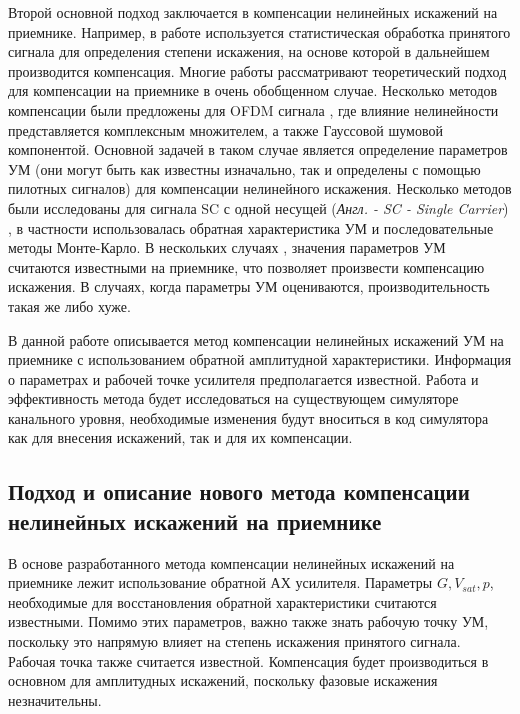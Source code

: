 Второй основной подход заключается в компенсации нелинейных искажений на
приемнике. Например, в работе \cite{maltsev2021} используется
статистическая обработка принятого сигнала для определения степени
искажения, на основе которой в дальнейшем производится компенсация. Многие
работы \cite[]{sharath2015, shabany2008,bhat2016,qi2010,gregorio2007,
bouhadda2015,drotar2010} рассматривают теоретический подход для компенсации
на приемнике в очень обобщенном случае. Несколько методов компенсации были
предложены для OFDM сигнала \cite[]{gregorio2007,bouhadda2015, drotar2010},
где влияние нелинейности представляется комплексным множителем, а также
Гауссовой шумовой компонентой. Основной задачей в таком случае является
определение параметров УМ (они могут быть как известны изначально, так и
определены с помощью пилотных сигналов) для компенсации нелинейного
искажения. Несколько методов были исследованы для сигнала SC с одной несущей
(\textit{Англ. - SC - Single Carrier}) \cite[]{sharath2015,
shabany2008,bhat2016, qi2010}, в частности использовалась обратная
характеристика УМ и последовательные методы Монте-Карло. В нескольких
случаях \cite[]{bhat2016, qi2010,gregorio2007}, значения параметров УМ
считаются известными на приемнике, что позволяет произвести компенсацию
искажения. В случаях, когда параметры УМ оцениваются, производительность
такая же либо хуже.

В данной работе описывается метод компенсации нелинейных искажений УМ на
приемнике с использованием обратной амплитудной характеристики. Информация
о параметрах и рабочей точке усилителя предполагается известной. Работа и
эффективность метода будет исследоваться на существующем симуляторе
канального уровня, необходимые изменения будут вноситься в код симулятора
как для внесения искажений, так и для их компенсации.







\subsection{Подход и описание нового метода компенсации
нелинейных искажений на приемнике}
В основе разработанного метода компенсации нелинейных искажений на
приемнике лежит использование обратной АХ усилителя. Параметры $G, V_{sat},
p$, необходимые для восстановления обратной характеристики считаются
известными. Помимо этих параметров, важно также знать рабочую точку УМ,
поскольку это напрямую влияет на степень искажения принятого сигнала.
Рабочая точка также считается известной. Компенсация будет производиться
в основном для амплитудных искажений, поскольку фазовые искажения незначительны.

